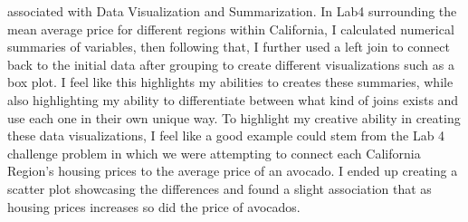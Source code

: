 \documentclass[
  letterpaper,
  DIV=11,
  numbers=noendperiod]{scrartcl}
\begin{document}
associated with Data Visualization and Summarization. In Lab4
surrounding the mean average price for different regions within
California, I calculated numerical summaries of variables, then
following that, I further used a left join to connect back to the
initial data after grouping to create different visualizations such as a
box plot. I feel like this highlights my abilities to creates these
summaries, while also highlighting my ability to differentiate between
what kind of joins exists and use each one in their own unique way. To
highlight my creative ability in creating these data visualizations, I
feel like a good example could stem from the Lab 4 challenge problem in
which we were attempting to connect each California Region's housing
prices to the average price of an avocado. I ended up creating a scatter
plot showcasing the differences and found a slight association that as
housing prices increases so did the price of avocados.
\end{document}
